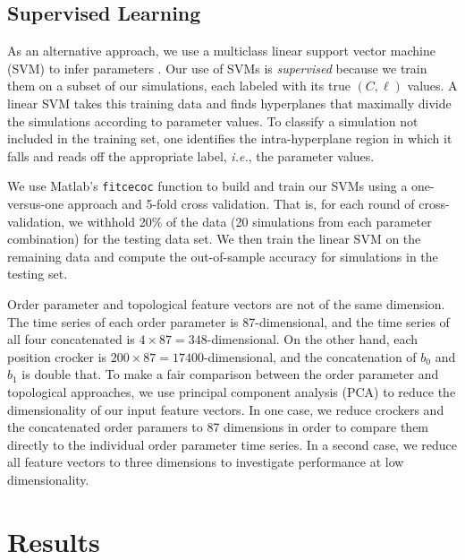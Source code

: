 \documentclass[%
 aip,
reprint,
 amsmath,amssymb,
 aps,
showkeys
]{revtex4-1}
\begin{document}
\subsection{Supervised Learning}
\label{sec:supervised} 

As an alternative approach, we use a multiclass linear support vector machine (SVM) to infer parameters \cite{cortes_support-vector_1995}. Our use of SVMs is \emph{supervised} because we train them on a subset of our simulations, each labeled with its true $(C,\ell)$ values. A linear SVM takes this training data and finds hyperplanes that maximally divide the simulations according to parameter values. To classify a simulation not included in the training set, one identifies the intra-hyperplane region in which it falls and reads off the appropriate label, \emph{i.e.}, the parameter values.

We use Matlab's \texttt{fitcecoc} function to build and train our SVMs using a one-versus-one approach and 5-fold cross validation. That is, for each round of cross-validation, we withhold 20\% of the data (20 simulations from each parameter combination) for the testing data set. We then train the linear SVM on the remaining data and compute the out-of-sample accuracy for simulations in the testing set.

Order parameter and topological feature vectors are not of the same dimension. The time series of each order parameter is 87-dimensional, and the time series of all four concatenated is $4 \times 87=348$-dimensional. On the other hand, each position crocker is $200\times 87=17400$-dimensional, and the concatenation of $b_0$ and $b_1$ is double that. To make a fair comparison between the order parameter and topological approaches, we use principal component analysis\cite{Jol1986} (PCA)  to reduce the dimensionality of our input feature vectors. In one case, we reduce crockers and the concatenated order paramers to 87 dimensions in order to compare them directly to the individual order parameter time series. In a second case, we reduce all feature vectors to three dimensions to investigate performance at low dimensionality. 

\section{\label{sec:results}Results}
\end{document}
